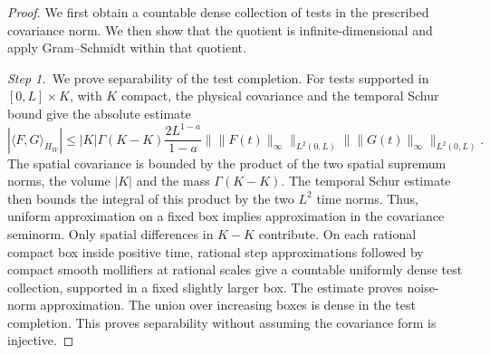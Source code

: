 \begin{proof}
  We first obtain a countable dense collection of tests in the prescribed
  covariance norm. We then show that the quotient is infinite-dimensional and
  apply Gram--Schmidt within that quotient.

  \medskip
  \noindent\textit{Step 1.~}We prove separability of the test completion.
  For tests supported in $[0,L]\times K$, with $K$ compact, the physical
  covariance and the temporal Schur bound give the absolute estimate
  \begin{equation}\label{E:driver-test-continuity}
    |\langle F,G\rangle_{H_W}|
    \le |K|\Gamma(K-K)\frac{2L^{1-a}}{1-a}
    \|\|F(t)\|_\infty\|_{L^2(0,L)}
    \|\|G(t)\|_\infty\|_{L^2(0,L)}.
  \end{equation}
  The spatial covariance is bounded by the product of the two spatial supremum
  norms, the volume $|K|$ and the mass $\Gamma(K-K)$. The temporal Schur
  estimate then bounds the integral of this product by the two $L^2$ time
  norms. Thus, uniform approximation on a fixed box implies approximation in
  the covariance seminorm.
  Only spatial differences in $K-K$ contribute. On each rational compact box
  inside positive time, rational step approximations followed by compact smooth
  mollifiers at rational scales give a countable uniformly dense test
  collection, supported in a fixed slightly larger box. The estimate proves
  noise-norm approximation. The union over increasing boxes is dense in the test
  completion. This proves separability without assuming the covariance form is
  injective.


\end{proof}

